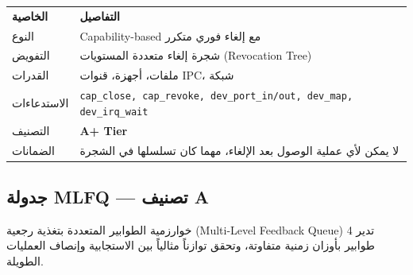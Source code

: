 \documentclass[12pt,a4paper]{article}
\theoremstyle{definition}
\newcommand{\codeinline}[1]{\texttt{\small #1}}
\newcommand{\en}[1]{\textenglish{#1}}
\begin{document}
\begin{center}
\begin{tabular}{L{3cm}L{8.5cm}}
\toprule
{}
\bfseries\color{white}\textarabic{الخاصية} & \bfseries\color{white}\textarabic{التفاصيل} \\
 النوع & \en{Capability-based} مع إلغاء فوري متكرر \\
التفويض & شجرة إلغاء متعددة المستويات (Revocation Tree) \\
 القدرات & ملفات، أجهزة، قنوات IPC، شبكة \\
الاستدعاءات &
  \codeinline{cap\_close, cap\_revoke, dev\_port\_in/out, dev\_map, dev\_irq\_wait} \\
 التصنيف & \textbf{\color{accent2} A+ Tier} \\
الضمانات & لا يمكن لأي عملية الوصول بعد الإلغاء، مهما كان تسلسلها في الشجرة \\
\bottomrule
\end{tabular}
\end{center}

\subsection{جدولة \en{MLFQ} --- تصنيف A}

خوارزمية الطوابير المتعددة بتغذية رجعية (Multi-Level Feedback Queue) تدير 4 طوابير بأوزان زمنية متفاوتة، وتحقق توازناً مثالياً بين الاستجابية وإنصاف العمليات الطويلة.

\vspace{0.3cm}
\end{document}
